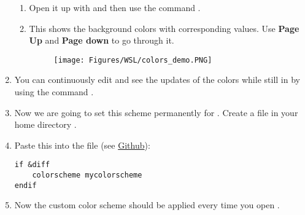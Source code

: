 \begin{enumerate}
\begin{enumerate}
    \item Open it up with  and then use the command .
    \item This shows the background colors with corresponding values. Use \textbf{Page Up} and \textbf{Page down} to go through it.
        \begin{figure}[H]
            \centering
            \texttt{[image: Figures/WSL/colors\_demo.PNG]}
        \end{figure}
    \end{enumerate}
    \item You can continuously edit  and see the updates of the colors while still in  by using the command .
    \item Now we are going to set this scheme permanently for . Create a file in your home directory .
    \newpage
    \item Paste this into the file (see \href{https://github.com/robinhellmers/computer_setup/blob/master/.vimrc}{Github}):
    
\begin{verbatim}
if &diff
    colorscheme mycolorscheme
endif
\end{verbatim}

\item Now the custom color scheme should be applied every time you open .

\end{enumerate}